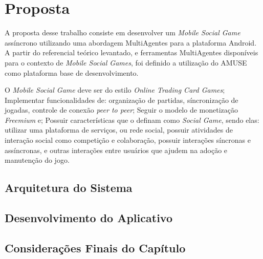 \chapter[Proposta]{Proposta}

A proposta desse trabalho consiste em desenvolver um \textit{Mobile Social Game} assíncrono utilizando uma abordagem MultiAgentes para a plataforma Android. A partir do referencial teórico levantado, e ferramentas MultiAgentes disponíveis para o contexto de \textit{Mobile Social Games}, foi definido a utilização do AMUSE como plataforma base de desenvolvimento.

O \textit{Mobile Social Game} deve ser do estilo \textit{Online Trading Card Games}; Implementar funcionalidades de: organização de partidas, síncronização de jogadas, controle de conexão \textit{peer to peer}; Seguir o modelo de monetização \textit{Freemium} e; Possuir características que o definam como \textit{Social Game}, sendo elas: utilizar uma plataforma de serviços, ou rede social, possuir atividades de interação social como competição e colaboração, possuir interações síncronas e assíncronas, e outras interações entre usuários que ajudem na adoção e manutenção do jogo.




\section{Arquitetura do Sistema}



\section{Desenvolvimento do Aplicativo}



\section{Considerações Finais do Capítulo}
